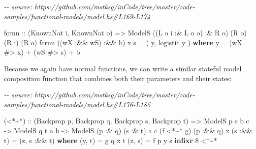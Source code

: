 \documentclass[]{article}
\newenvironment{Shaded}{}{}
\newcommand{\CommentTok}[1]{\textcolor[rgb]{0.38,0.63,0.69}{\textit{#1}}}
\newcommand{\DataTypeTok}[1]{\textcolor[rgb]{0.56,0.13,0.00}{#1}}
\newcommand{\DecValTok}[1]{\textcolor[rgb]{0.25,0.63,0.44}{#1}}
\newcommand{\KeywordTok}[1]{\textcolor[rgb]{0.00,0.44,0.13}{\textbf{#1}}}
\newcommand{\NormalTok}[1]{#1}
\newcommand{\OperatorTok}[1]{\textcolor[rgb]{0.40,0.40,0.40}{#1}}
\newcommand{\OtherTok}[1]{\textcolor[rgb]{0.00,0.44,0.13}{#1}}
\begin{document}
\begin{Shaded}
\begin{Highlighting}[]
\CommentTok{{-}{-} source: https://github.com/mstksg/inCode/tree/master/code{-}samples/functional{-}models/model.hs\#L169{-}L174}

\NormalTok{fcrnn}
\OtherTok{    ::}\NormalTok{ (}\DataTypeTok{KnownNat}\NormalTok{ i, }\DataTypeTok{KnownNat}\NormalTok{ o)}
    \OtherTok{=\textgreater{}} \DataTypeTok{ModelS}\NormalTok{ ((}\DataTypeTok{L}\NormalTok{ o i }\OperatorTok{:\&} \DataTypeTok{L}\NormalTok{ o o) }\OperatorTok{:\&} \DataTypeTok{R}\NormalTok{ o) (}\DataTypeTok{R}\NormalTok{ o) (}\DataTypeTok{R}\NormalTok{ i) (}\DataTypeTok{R}\NormalTok{ o)}
\NormalTok{fcrnn ((wX }\OperatorTok{:\&\&}\NormalTok{ wS) }\OperatorTok{:\&\&}\NormalTok{ b) x s }\OtherTok{=}\NormalTok{ ( y, logistic y )}
  \KeywordTok{where}
\NormalTok{    y  }\OtherTok{=}\NormalTok{ (wX }\OperatorTok{\#\textgreater{}}\NormalTok{ x) }\OperatorTok{+}\NormalTok{ (wS }\OperatorTok{\#\textgreater{}}\NormalTok{ s) }\OperatorTok{+}\NormalTok{ b}
\end{Highlighting}
\end{Shaded}

Because we again have normal functions, we can write a similar stateful model
composition function that combines both their parameters and their states:

\begin{Shaded}
\begin{Highlighting}[]
\CommentTok{{-}{-} source: https://github.com/mstksg/inCode/tree/master/code{-}samples/functional{-}models/model.hs\#L176{-}L185}

\NormalTok{(}\OperatorTok{\textless{}*\textasciitilde{}*}\NormalTok{)}
\OtherTok{  ::}\NormalTok{ (}\DataTypeTok{Backprop}\NormalTok{ p, }\DataTypeTok{Backprop}\NormalTok{ q, }\DataTypeTok{Backprop}\NormalTok{ s, }\DataTypeTok{Backprop}\NormalTok{ t)}
    \OtherTok{=\textgreater{}} \DataTypeTok{ModelS}\NormalTok{  p        s       b c}
    \OtherTok{{-}\textgreater{}} \DataTypeTok{ModelS}\NormalTok{       q        t  a b}
    \OtherTok{{-}\textgreater{}} \DataTypeTok{ModelS}\NormalTok{ (p }\OperatorTok{:\&}\NormalTok{ q) (s }\OperatorTok{:\&}\NormalTok{ t) a c}
\NormalTok{(f }\OperatorTok{\textless{}*\textasciitilde{}*}\NormalTok{ g) (p }\OperatorTok{:\&\&}\NormalTok{ q) x (s }\OperatorTok{:\&\&}\NormalTok{ t) }\OtherTok{=}\NormalTok{ (z, s\textquotesingle{} }\OperatorTok{:\&\&}\NormalTok{ t\textquotesingle{})}
  \KeywordTok{where}
\NormalTok{    (y, t\textquotesingle{}) }\OtherTok{=}\NormalTok{ g q x t}
\NormalTok{    (z, s\textquotesingle{}) }\OtherTok{=}\NormalTok{ f p y s}
\KeywordTok{infixr} \DecValTok{8} \OperatorTok{\textless{}*\textasciitilde{}*}
\end{Highlighting}
\end{Shaded}
\end{document}
